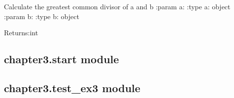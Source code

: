 \documentclass[letterpaper,10pt,english]{sphinxmanual}
\begin{document}
\begin{fulllineitems}
\label{\detokenize{chapter3:chapter3.functions_demo.calculate_gcd}}
\pysigstartsignatures
{}
\pysigstopsignatures
\sphinxAtStartPar
Calculate the greatest common divisor of a and b
:param a:
:type a: object
:param b:
:type b: object

\sphinxAtStartPar
Returns:int

\end{fulllineitems}


\begin{fulllineitems}
\label{\detokenize{chapter3:chapter3.functions_demo.calculate_gcd_alt}}
\pysigstartsignatures
{}
\pysigstopsignatures
\end{fulllineitems}



\subsection{chapter3.start module}
\label{\detokenize{chapter3:chapter3-start-module}}

\subsection{chapter3.test\_ex3 module}
\label{\detokenize{chapter3:module-chapter3.test_ex3}}\label{\detokenize{chapter3:chapter3-test-ex3-module}}
\end{document}
